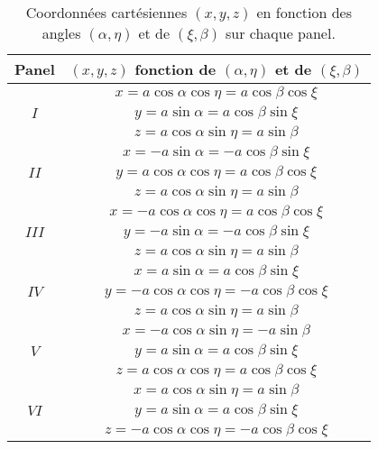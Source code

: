\begin{table}[htbp]
\begin{center}
\begin{tabular}{|c|c|}
\hline
\textbf{Panel} & $(x,y,z)$ \textbf{fonction de} $(\alpha, \eta)$ \textbf{et de} $(\xi, \beta)$ \\

\hline
\hline
    & $x=a \cos \alpha \cos \eta  =  a \cos \beta \cos \xi$ \\ 
$I$ & $y=a \sin \alpha  =  a \cos \beta \sin \xi$ \\
    & $z=a \cos \alpha \sin \eta  =  a \sin \beta$ \\
\hline
\hline
      & $x=- a \sin \alpha  = - a \cos \beta \sin \xi$ \\ 
$II$  & $y=a \cos \alpha \cos \eta  =  a \cos \beta \cos \xi$ \\
      & $z=a \cos \alpha \sin \eta  =  a \sin \beta$ \\
\hline
\hline
      & $x=- a \cos \alpha \cos \eta = a \cos \beta \cos \xi$ \\ 
$III$ & $y=- a \sin \alpha = - a \cos \beta \sin \xi$ \\
      & $z=a \cos \alpha \sin \eta = a \sin \beta$ \\
\hline
\hline
      & $x=a \sin \alpha = a \cos \beta \sin \xi$ \\ 
$IV$  & $y=- a \cos \alpha \cos \eta = - a \cos \beta \cos \xi$ \\
      & $z=a \cos \alpha \sin \eta = a \sin \beta$ \\
\hline
\hline
    & $x=-a \cos \alpha \sin \eta = - a \sin \beta$ \\ 
$V$ & $y=a \sin \alpha = a \cos \beta \sin \xi$ \\
    & $z=a \cos \alpha \cos \eta = a \cos \beta \cos \xi$ \\
\hline
\hline
     & $x=a \cos \alpha \sin \eta = a \sin \beta$ \\ 
$VI$ & $y=a \sin \alpha = a \cos \beta \sin \xi$ \\
     & $z=- a \cos \alpha \cos \eta = - a \cos \beta \cos \xi$ \\
\hline
\end{tabular}
\end{center}
\caption{Coordonnées cartésiennes $(x,y,z)$ en fonction des angles $(\alpha, \eta)$ et de $(\xi, \beta)$  sur chaque panel.}
\label{tab: x y z fct de xi eta alfa beta}
\end{table}

